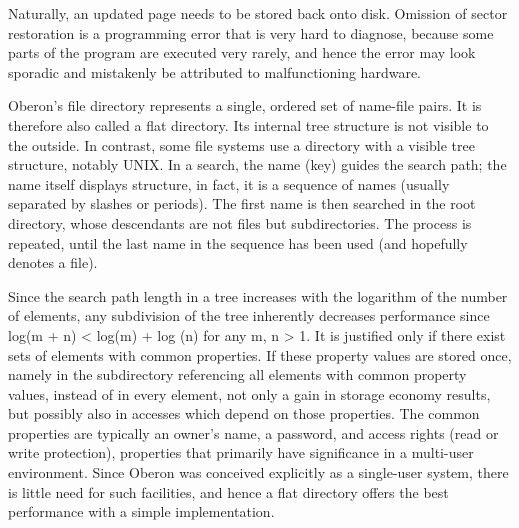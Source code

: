 Naturally, an updated page needs to be stored back onto disk. Omission of sector restoration is a
programming error that is very hard to diagnose, because some parts of the program are
executed very rarely, and hence the error may look sporadic and mistakenly be attributed to
malfunctioning hardware.

Oberon's file directory represents a single, ordered set of name-file pairs. It is therefore also
called a flat directory. Its internal tree structure is not visible to the outside. In contrast, some file
systems use a directory with a visible tree structure, notably UNIX. In a search, the name (key)
guides the search path; the name itself displays structure, in fact, it is a sequence of names
(usually separated by slashes or periods). The first name is then searched in the root directory,
whose descendants are not files but subdirectories. The process is repeated, until the last name
in the sequence has been used (and hopefully denotes a file).

Since the search path length in a tree increases with the logarithm of the number of elements,
any subdivision of the tree inherently decreases performance since log(m + n) < log(m) + log (n)
for any m, n > 1. It is justified only if there exist sets of elements with common properties. If these
property values are stored once, namely in the subdirectory referencing all elements with
common property values, instead of in every element, not only a gain in storage economy results,
but possibly also in accesses which depend on those properties. The common properties are
typically an owner's name, a password, and access rights (read or write protection), properties
that primarily have significance in a multi-user environment. Since Oberon was conceived
explicitly as a single-user system, there is little need for such facilities, and hence a flat directory
offers the best performance with a simple implementation.

